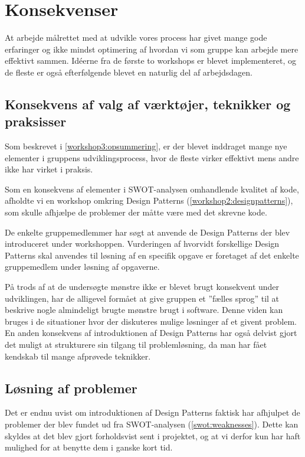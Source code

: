 \section{Konsekvenser}\label{konsekvenser}
At arbejde målrettet med at udvikle vores process har givet mange gode erfaringer og ikke mindst optimering af hvordan vi som gruppe kan arbejde mere effektivt sammen.
Idéerne fra de første to workshops er blevet implementeret, og de fleste er også efterfølgende blevet en naturlig del af arbejdsdagen.

\subsection{Konsekvens af valg af værktøjer, teknikker og praksisser}\label{konsekvens:valg}
Som beskrevet i \cref{workshop3:opsummering}, er der blevet inddraget mange nye elementer i gruppens udviklingsprocess, hvor de fleste virker effektivt mens andre ikke har virket i praksis.

Som en konsekvens af elementer i SWOT-analysen omhandlende kvalitet af kode, afholdte vi en workshop omkring Design Patterns (\cref{workshop2:designpatterns}), som skulle afhjælpe de problemer der måtte være med det skrevne kode.

De enkelte gruppemedlemmer har søgt at anvende de Design Patterns der blev introduceret under workshoppen.
Vurderingen af hvorvidt forskellige Design Patterns skal anvendes til løsning af en specifik opgave er foretaget af det enkelte gruppemedlem under løsning af opgaverne.

På trods af at de undersøgte mønstre ikke er blevet brugt konsekvent under udviklingen, har de alligevel formået at give gruppen et ''fælles sprog'' til at beskrive nogle almindeligt brugte mønstre brugt i software.
Denne viden kan bruges i de situationer hvor der diskuteres mulige løsninger af et givent problem.
En anden konsekvens af introduktionen af Design Patterns har også delvist gjort det muligt at strukturere sin tilgang til problemløsning, da man har fået kendskab til mange afprøvede teknikker.

\subsection{Løsning af problemer}\label{konsekvens:problemer}
Det er endnu uvist om introduktionen af Design Patterns faktisk har afhjulpet de problemer der blev fundet ud fra SWOT-analysen (\cref{swot:weaknesses}).
Dette kan skyldes at det blev gjort forholdsvist sent i projektet, og at vi derfor kun har haft mulighed for at benytte dem i ganske kort tid.

